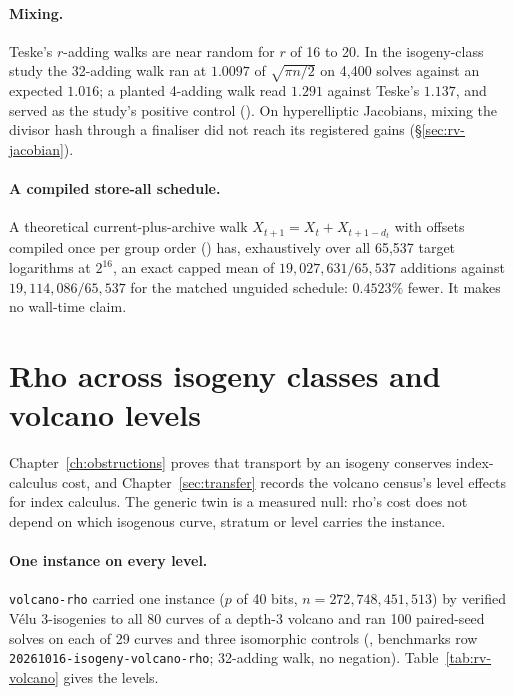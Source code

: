 \paragraph{Mixing.} Teske's $r$-adding walks are near random for $r$ of 16
to 20. In the isogeny-class study the 32-adding walk ran at $1.0097$ of
$\sqrt{\pi n/2}$ on 4{,}400 solves against an expected $1.016$; a planted
4-adding walk read $1.291$ against Teske's $1.137$, and served as the
study's positive control (). On
hyperelliptic Jacobians, mixing the divisor hash through a finaliser did
not reach its registered gains (\S\ref{sec:rv-jacobian}).

\paragraph{A compiled store-all schedule.} A theoretical current-plus-archive
walk $X_{t+1}=X_t+X_{t+1-d_t}$ with offsets compiled once per group order
() has, exhaustively over
all 65{,}537 target logarithms at $2^{16}$, an exact capped mean of
$19{,}027{,}631/65{,}537$ additions against $19{,}114{,}086/65{,}537$ for the
matched unguided schedule: $0.4523\%$ fewer. It makes no wall-time claim.

\section{Rho across isogeny classes and volcano levels}\label{sec:rv-isogeny}

Chapter~\ref{ch:obstructions} proves that transport by an isogeny conserves
index-calculus cost, and Chapter~\ref{sec:transfer} records the volcano
census's level effects for index calculus. The generic twin is a measured
null: rho's cost does not depend on which isogenous curve, stratum or level
carries the instance.

\paragraph{One instance on every level.} \texttt{volcano-rho} carried one
instance ($p$ of 40 bits, $n=272{,}748{,}451{,}513$) by verified V\'elu
3-isogenies to all 80 curves of a depth-3 volcano and ran 100 paired-seed
solves on each of 29 curves and three isomorphic controls
(, benchmarks row
\texttt{20261016-isogeny-volcano-rho}; 32-adding walk, no negation).
Table~\ref{tab:rv-volcano} gives the levels.

